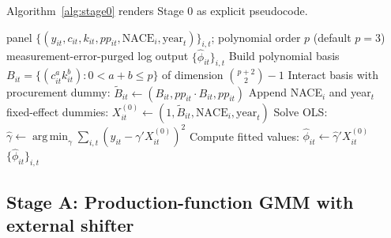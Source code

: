 \documentclass[11pt]{article}
\DeclareMathOperator*{\argmin}{arg\,min}
\begin{document}
Algorithm~\ref{alg:stage0} renders Stage 0 as explicit pseudocode.

\begin{algorithm}[htbp]
\caption{Stage 0 --- First-stage inversion}\label{alg:stage0}
\begin{algorithmic}[1]
\INPUT panel $\{(y_{it}, c_{it}, k_{it}, pp_{it}, \text{NACE}_i, \text{year}_t)\}_{i,t}$; polynomial order $p$ (default $p=3$)
\OUTPUT measurement-error-purged log output $\{\hat\phi_{it}\}_{i,t}$
\State Build polynomial basis $B_{it} = \{(c_{it}^a k_{it}^b) : 0 < a + b \leq p\}$ of dimension $\binom{p+2}{2} - 1$
\State Interact basis with procurement dummy: $\widetilde B_{it} \gets (B_{it}, pp_{it}\cdot B_{it}, pp_{it})$
\State Append NACE$_i$ and year$_t$ fixed-effect dummies: $X^{(0)}_{it} \gets (1, \widetilde B_{it}, \text{NACE}_i, \text{year}_t)$
\State Solve OLS: $\hat\gamma \gets \argmin_\gamma \sum_{i,t} (y_{it} - \gamma' X^{(0)}_{it})^2$
\State Compute fitted values: $\hat\phi_{it} \gets \hat\gamma' X^{(0)}_{it}$ 
\State \Return $\{\hat\phi_{it}\}_{i,t}$
\end{algorithmic}
\end{algorithm}

\subsection{Stage A: Production-function GMM with external shifter}
\end{document}

